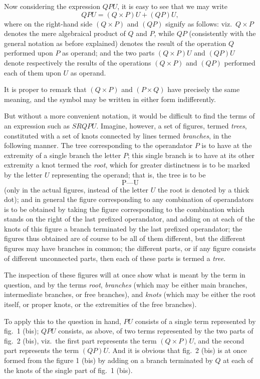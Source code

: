 \documentclass[11pt,a4paper]{book}
\begin{document}
Now considering the expression $QPU$, it is easy to see that we may write
\[
QPU = (Q \times P)U + (QP)U,
\]
where on the right-hand side $(Q \times P)$ and $(QP)$ signify as follows: viz.\ $Q \times P$ denotes the mere algebraical product of $Q$ and $P$, while $QP$ (consistently with the general notation as before explained) denotes the result of the operation $Q$ performed upon $P$ as operand; and the two parts $(Q \times P)U$ and $(QP)U$ denote respectively the results of the operations $(Q \times P)$ and $(QP)$ performed each of them upon $U$ as operand.

It is proper to remark that $(Q \times P)$ and $(P \times Q)$ have precisely the same meaning, and the symbol may be written in either form indifferently.

But without a more convenient notation, it would be difficult to find the terms of an expression such as $SRQPU$. Imagine, however, a set of figures, termed \textit{trees}, constituted with a set of knots connected by lines termed \textit{branches}, in the following manner. The tree corresponding to the operandator $P$ is to have at the extremity of a single branch the letter $P$; this single branch is to have at its other extremity a knot termed the \textit{root}, which for greater distinctness is to be marked by the letter $U$ representing the operand; that is, the tree is to be
\[
\text{P---U}
\]
(only in the actual figures, instead of the letter $U$ the root is denoted by a thick dot); and in general the figure corresponding to any combination of operandators is to be obtained by taking the figure corresponding to the combination which stands on the right of the last prefixed operandator, and adding on at each of the knots of this figure a branch terminated by the last prefixed operandator; the figures thus obtained are of course to be all of them different, but the different figures may have branches in common; the different parts, or if any figure consists of different unconnected parts, then each of these parts is termed a \textit{tree}.

The inspection of these figures will at once show what is meant by the term in question, and by the terms \textit{root}, \textit{branches} (which may be either main branches, intermediate branches, or free branches), and \textit{knots} (which may be either the root itself, or proper knots, or the extremities of the free branches).

To apply this to the question in hand, $PU$ consists of a single term represented by fig.~1 (bis); $QPU$ consists, as above, of two terms represented by the two parts of fig.~2 (bis), viz.\ the first part represents the term $(Q \times P)U$, and the second part represents the term $(QP)U$. And it is obvious that fig.~2 (bis) is at once formed from the figure 1 (bis) by adding on a branch terminated by $Q$ at each of the knots of the single part of fig.~1 (bis).
\end{document}
